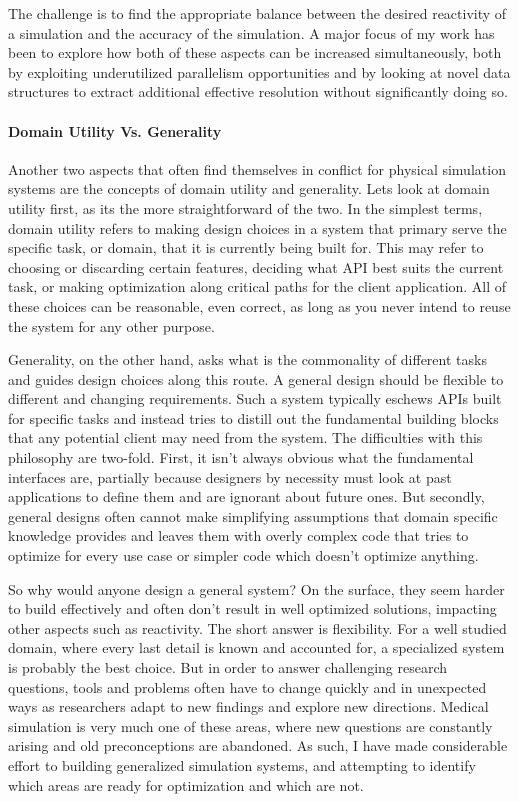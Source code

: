 \documentclass[12pt,oneside,letterpaper]{memoir}
\begin{document}
The challenge is to find the appropriate balance between the desired
reactivity of a simulation and the accuracy of the simulation. A major
focus of my work has been to explore how both of these aspects can be
increased simultaneously, both by exploiting underutilized parallelism
opportunities and by looking at novel data structures to extract
additional effective resolution without significantly doing so.
  
\paragraph{Domain Utility Vs. Generality}

Another two aspects that often find themselves in conflict for
physical simulation systems are the concepts of domain utility and
generality. Lets look at domain utility first, as its the more
straightforward of the two. In the simplest terms, domain utility
refers to making design choices in a system that primary serve the
specific task, or domain, that it is currently being built for. This
may refer to choosing or discarding certain features, deciding what
API best suits the current task, or making optimization along critical
paths for the client application. All of these choices can be
reasonable, even correct, as long as you never intend to reuse the
system for any other purpose.

Generality, on the other hand, asks what is the commonality of
different tasks and guides design choices along this route. A general
design should be flexible to different and changing requirements. Such
a system typically eschews APIs built for specific tasks and instead
tries to distill out the fundamental building blocks that any
potential client may need from the system. The difficulties with this
philosophy are two-fold. First, it isn't always obvious what the
fundamental interfaces are, partially because designers by necessity
must look at past applications to define them and are ignorant about
future ones. But secondly, general designs often cannot make
simplifying assumptions that domain specific knowledge provides and
leaves them with overly complex code that tries to optimize for every
use case or simpler code which doesn't optimize anything.

So why would anyone design a general system? On the surface, they seem
harder to build effectively and often don't result in well optimized
solutions, impacting other aspects such as reactivity. The short
answer is flexibility. For a well studied domain, where every last
detail is known and accounted for, a specialized system is probably
the best choice. But in order to answer challenging research
questions, tools and problems often have to change quickly and in
unexpected ways as researchers adapt to new findings and explore new
directions. Medical simulation is very much one of these areas, where
new questions are constantly arising and old preconceptions are
abandoned. As such, I have made considerable effort to building
generalized simulation systems, and attempting to identify which areas
are ready for optimization and which are not.
\end{document}
